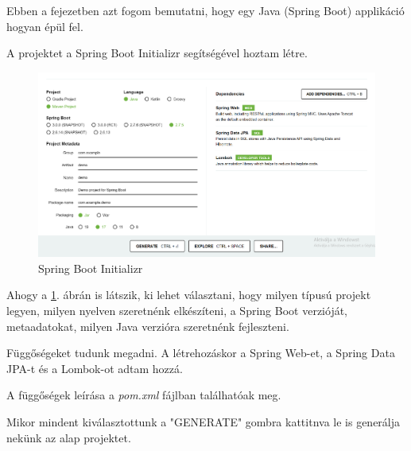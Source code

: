
Ebben a fejezetben azt fogom bemutatni, hogy egy Java (Spring Boot) applikáció hogyan épül fel.

A projektet a Spring Boot Initializr segítségével hoztam létre.

\begin{figure}[h]
\centering
\includegraphics[scale=0.37]{images/Spring_init.png}
\caption{Spring Boot Initializr \cite{SpringInit}}
\label{fig:Spring_Boot_Initializr}
\end{figure}

Ahogy a \ref{fig:Spring_Boot_Initializr}. ábrán is látszik, ki lehet választani, hogy milyen típusú projekt legyen, milyen nyelven szeretnénk elkészíteni, a Spring Boot verzióját, metaadatokat, milyen Java verzióra szeretnénk fejleszteni.

Függőségeket tudunk megadni. A létrehozáskor a Spring Web-et, a Spring Data JPA-t és a Lombok-ot adtam hozzá.

A függőségek leírása a \textit{pom.xml} fájlban találhatóak meg. 

Mikor mindent kiválasztottunk a "GENERATE" gombra kattitnva le is generálja nekünk az alap projektet.
\newpage


